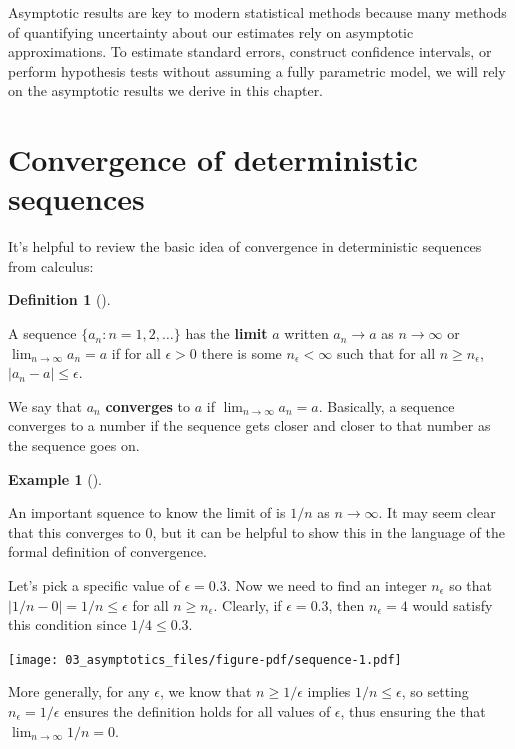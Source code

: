 \documentclass[
  letterpaper,
  DIV=11,
  numbers=noendperiod]{scrreprt}
\theoremstyle{definition}
\newtheorem{definition}{Definition}[chapter]
\theoremstyle{plain}
\theoremstyle{definition}
\newtheorem{example}{Example}[chapter]
\theoremstyle{remark}
\begin{document}
Asymptotic results are key to modern statistical methods because many
methods of quantifying uncertainty about our estimates rely on
asymptotic approximations. To estimate standard errors, construct
confidence intervals, or perform hypothesis tests without assuming a
fully parametric model, we will rely on the asymptotic results we derive
in this chapter.

\hypertarget{convergence-of-deterministic-sequences}{%
\section{Convergence of deterministic
sequences}\label{convergence-of-deterministic-sequences}}

It's helpful to review the basic idea of convergence in deterministic
sequences from calculus:

\begin{definition}[]\protect\hypertarget{def-limit}{}\label{def-limit}

A sequence \(\{a_n: n = 1, 2, \ldots\}\) has the \textbf{limit} \(a\)
written \(a_n \rightarrow a\) as \(n\rightarrow \infty\) or
\(\lim_{n\rightarrow \infty} a_n = a\) if for all \(\epsilon > 0\) there
is some \(n_{\epsilon} < \infty\) such that for all
\(n \geq n_{\epsilon}\), \(|a_n - a| \leq \epsilon\).

\end{definition}

We say that \(a_n\) \textbf{converges} to \(a\) if
\(\lim_{n\rightarrow\infty} a_n = a\). Basically, a sequence converges
to a number if the sequence gets closer and closer to that number as the
sequence goes on.

\begin{example}[]\protect\hypertarget{exm-limit}{}\label{exm-limit}

An important squence to know the limit of is \(1/n\) as \(n\to\infty\).
It may seem clear that this converges to 0, but it can be helpful to
show this in the language of the formal definition of convergence.

Let's pick a specific value of \(\epsilon = 0.3\). Now we need to find
an integer \(n_{\epsilon}\) so that \(|1/n - 0| = 1/n \leq \epsilon\)
for all \(n \geq n_{\epsilon}\). Clearly, if \(\epsilon = 0.3\), then
\(n_{\epsilon} = 4\) would satisfy this condition since
\(1/4 \leq 0.3\).

\texttt{[image: 03\_asymptotics\_files/figure-pdf/sequence-1.pdf]}

More generally, for any \(\epsilon\), we know that \(n \geq 1/\epsilon\)
implies \(1/n \leq \epsilon\), so setting \(n_{\epsilon} = 1/\epsilon\)
ensures the definition holds for all values of \(\epsilon\), thus
ensuring the that \(\lim_{n\to\infty} 1/n = 0\).

\end{example}
\end{document}
